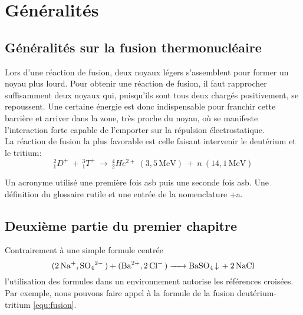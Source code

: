 \chapter{ Généralités}
\chaptertoc{}

\section{Généralités sur la fusion thermonucléaire}

	Lors d'une réaction de fusion, deux noyaux légers s'assemblent pour former un noyau plus lourd. Pour obtenir une réaction de fusion, il faut rapprocher suffisamment deux noyaux qui, puisqu'ils sont tous deux chargés positivement, se repoussent. Une certaine énergie est donc indispensable pour franchir cette barrière et arriver dans la zone, très proche du noyau, où se manifeste l'interaction forte capable de l'emporter sur la répulsion électrostatique.
	\\ %
	La réaction de fusion la plus favorable est celle faisant intervenir le deutérium et le tritium:
	\begin{equation}
		_{1}^{2}D^{+}~+~_{1}^{3}T^{+}~\rightarrow ~_{2}^{4}He^{2+}~(3,5\,\textrm{MeV})~+~n~(14,1\,\textrm{MeV})
	    \label{equ:fusion}
	\end{equation}

	\noindent %
	\lipsum[2]
	Un acronyme utilisé une première fois \gls{asb} puis une seconde fois \gls{asb}. Une définition du glossaire \gls{rutile} et une entrée de la nomenclature \gls{+a}.

\section{Deuxième partie du premier chapitre}

	\lipsum[2]

	Contrairement à une simple formule centrée
	$$\ce{(2Na+,SO4^2- ) + (Ba^2+, 2Cl- ) -> BaSO4 v + 2NaCl}$$
	l'utilisation des formules dans un environnement autorise les références croisées. Par exemple, nous pouvons faire appel à la formule de la fusion deutérium-tritium \ref{equ:fusion}.